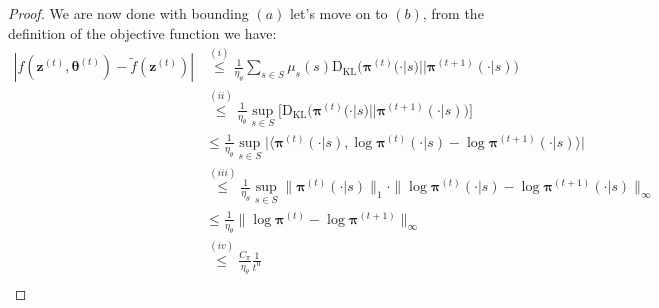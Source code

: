 \begin{proof}
We are now done with bounding $(a)$ let's move on to $(b)$, from the definition of the objective function we have:
\begin{align*}
    |f(\bm{z}^{(t)},\bm{\theta}^{(t)}) - \tilde{f}(\bm{z}^{(t)}) |
    &\stackrel{(i)}{\leq} \frac{1}{\eta_\theta} \sum_{s \in S} \mu_s(s) \text{D}_\text{KL}
    \bigl( \bm{\pi}^{(t)}(\cdot|s) || \bm{\pi}^{(t+1)}(\cdot|s)  \bigr)\\
    &\stackrel{(ii)}{\leq} \frac{1}{\eta_\theta} \sup_{s \in S} 
    \Bigg[
        \text{D}_\text{KL}
        \bigl( \bm{\pi}^{(t)}(\cdot|s) || 
        \bm{\pi}^{(t+1)}(\cdot|s)  \bigr)
    \Bigg]\\
    &{\leq} \frac{1}{\eta_\theta} \sup_{s \in S} 
    \Big|\big\langle 
        \bm{\pi}^{(t)}(\cdot|s),
        \log\bm{\pi}^{(t)}(\cdot|s) - \log \bm{\pi}^{(t+1)}(\cdot|s) 
    \big\rangle\Big| \\
    &\stackrel{(iii)}{\leq} \frac{1}{\eta_\theta} \sup_{s \in S} 
        \|\bm{\pi}^{(t)}(\cdot|s) \|_1 \cdot
        \| \log\bm{\pi}^{(t)}(\cdot|s) - \log \bm{\pi}^{(t+1)}(\cdot|s) \|_\infty\\
    &{\leq} \frac{1}{\eta_\theta} 
        \| \log\bm{\pi}^{(t)} - \log \bm{\pi}^{(t+1)} \|_\infty\\
    &\stackrel{(iv)}{\leq} \frac{C_\pi}{\eta_\theta} 
        \frac{1}{t^u}\\

\end{align*}
\end{proof}
